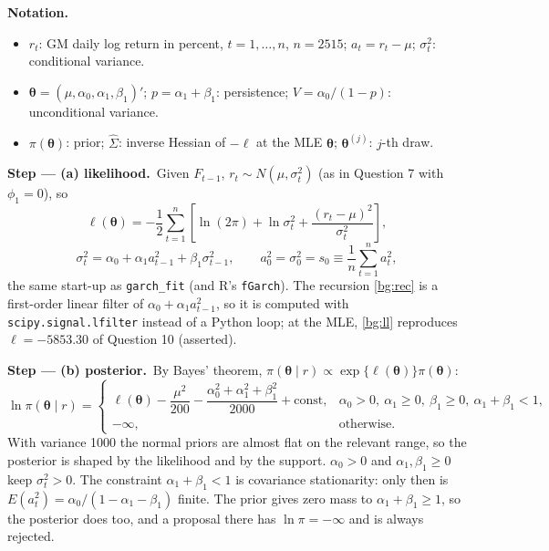 \documentclass[11pt,a4paper]{article}
\newenvironment{notacao}{\par\smallskip\noindent\textbf{Notation.}\begin{itemize}[leftmargin=1.4em,topsep=1pt,itemsep=0pt]\small}{\end{itemize}}
\newcommand{\passo}[2]{\par\smallskip\noindent\textbf{Step --- #1.}~#2}
\begin{document}
\begin{sol}
\begin{notacao}
\item $r_t$: GM daily log return in percent, $t=1,\dots,n$, $n=2515$; $a_t=r_t-\mu$; $\sigma_t^2$: conditional variance.
\item $\boldsymbol\theta=(\mu,\alpha_0,\alpha_1,\beta_1)'$; $p=\alpha_1+\beta_1$: persistence; $V=\alpha_0/(1-p)$: unconditional variance.
\item $\pi(\boldsymbol\theta)$: prior; $\hat\Sigma$: inverse Hessian of $-\ell$ at the MLE $\hat{\boldsymbol\theta}$; $\boldsymbol\theta^{(j)}$: $j$-th draw.
\end{notacao}

\passo{(a) likelihood}{Given $F_{t-1}$, $r_t\sim N(\mu,\sigma_t^2)$ (as in Question 7 with $\phi_1=0$), so}
\begin{equation}\label{bg:ll} \ell(\boldsymbol\theta)=-\frac12\sum_{t=1}^{n}\left[\ln(2\pi)+\ln\sigma_t^2+\frac{(r_t-\mu)^2}{\sigma_t^2}\right], \end{equation}
\begin{equation}\label{bg:rec} \sigma_t^2=\alpha_0+\alpha_1a_{t-1}^2+\beta_1\sigma_{t-1}^2,\qquad a_0^2=\sigma_0^2=s_0\equiv\frac1n\sum_{t=1}^na_t^2 , \end{equation}
the same start-up as \texttt{garch\_fit} (and R's \texttt{fGarch}). The recursion \eqref{bg:rec} is a
first-order linear filter of $\alpha_0+\alpha_1a_{t-1}^2$, so it is computed with \texttt{scipy.signal.lfilter}
instead of a Python loop; at the MLE, \eqref{bg:ll} reproduces $\ell=-5853.30$ of Question 10 (asserted).

\passo{(b) posterior}{By Bayes' theorem, $\pi(\boldsymbol\theta\mid r)\propto\exp\{\ell(\boldsymbol\theta)\}\pi(\boldsymbol\theta)$:}
\begin{equation}\label{bg:lp}
\ln\pi(\boldsymbol\theta\mid r)=\begin{cases}\ell(\boldsymbol\theta)-\dfrac{\mu^2}{200}-\dfrac{\alpha_0^2+\alpha_1^2+\beta_1^2}{2000}+\text{const}, & \alpha_0>0,\ \alpha_1\ge0,\ \beta_1\ge0,\ \alpha_1+\beta_1<1,\\[4pt] -\infty, & \text{otherwise.}\end{cases}
\end{equation}
With variance 1000 the normal priors are almost flat on the relevant range, so the posterior is shaped by the
likelihood and by the support. $\alpha_0>0$ and $\alpha_1,\beta_1\ge0$ keep $\sigma_t^2>0$. The constraint
$\alpha_1+\beta_1<1$ is covariance stationarity: only then is $E(a_t^2)=\alpha_0/(1-\alpha_1-\beta_1)$ finite. The
prior gives zero mass to $\alpha_1+\beta_1\ge1$, so the posterior does too, and a proposal there has
$\ln\pi=-\infty$ and is always rejected.


\end{sol}
\end{document}
